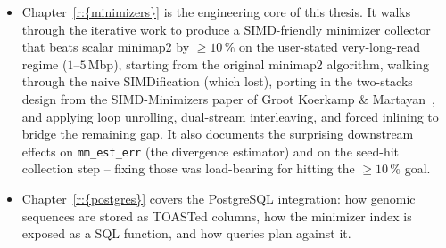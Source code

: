 \begin{itemize}
\item Chapter~\ref{r:{minimizers}} is the engineering core of
  this thesis. It walks through the iterative work to produce a
  SIMD-friendly minimizer collector that beats scalar minimap2 by
  $\geq 10\,\%$ on the user-stated very-long-read regime
  ($1$--$5$\,Mbp), starting from the original minimap2 algorithm,
  walking through the naive SIMDification (which lost), porting in
  the two-stacks design from the SIMD-Minimizers paper of Groot
  Koerkamp \& Martayan~\cite{groot_koerkamp_simd_minimizers_2025},
  and applying loop unrolling, dual-stream interleaving, and forced
  inlining to bridge the remaining gap. It also documents the
  surprising downstream effects on \texttt{mm\_est\_err} (the
  divergence estimator) and on the seed-hit collection step --
  fixing those was load-bearing for hitting the
  $\geq 10\,\%$ goal.
\item Chapter~\ref{r:{postgres}} covers the PostgreSQL
  integration: how genomic sequences are stored as TOASTed columns,
  how the minimizer index is exposed as a SQL function, and how
  queries plan against it.
\end{itemize}
